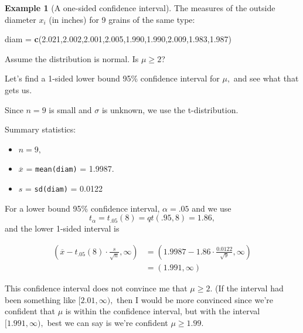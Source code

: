 \documentclass[
]{book}
\newenvironment{Shaded}{\begin{snugshade}}{\end{snugshade}}
\newcommand{\FloatTok}[1]{\textcolor[rgb]{0.00,0.00,0.81}{#1}}
\newcommand{\FunctionTok}[1]{\textcolor[rgb]{0.13,0.29,0.53}{\textbf{#1}}}
\newcommand{\NormalTok}[1]{#1}
\newcommand{\OtherTok}[1]{\textcolor[rgb]{0.56,0.35,0.01}{#1}}
\providecommand{\tightlist}{%
  \setlength{\itemsep}{0pt}\setlength{\parskip}{0pt}}
\theoremstyle{definition}
\theoremstyle{definition}
\newtheorem{example}{Example}[chapter]
\theoremstyle{definition}
\theoremstyle{definition}
\theoremstyle{remark}
\begin{document}
\begin{example}[A one-sided confidence interval]
The measures of the outside diameter \(x_i\) (in inches) for 9 grains of the same type:

\begin{Shaded}
\begin{Highlighting}[]
\NormalTok{diam }\OtherTok{=} \FunctionTok{c}\NormalTok{(}\FloatTok{2.021}\NormalTok{,}\FloatTok{2.002}\NormalTok{,}\FloatTok{2.001}\NormalTok{,}\FloatTok{2.005}\NormalTok{,}\FloatTok{1.990}\NormalTok{,}\FloatTok{1.990}\NormalTok{,}\FloatTok{2.009}\NormalTok{,}\FloatTok{1.983}\NormalTok{,}\FloatTok{1.987}\NormalTok{)}
\end{Highlighting}
\end{Shaded}

Assume the distribution is normal. Is \(\mu \geq 2\)?

Let's find a 1-sided lower bound 95\% confidence interval for \(\mu,\) and see what that gets us.

Since \(n = 9\) is small and \(\sigma\) is unknown, we use the t-distribution.

Summary statistics:

\begin{itemize}
\tightlist
\item
  \(n = 9,\)
\item
  \(\overline{x}\) = \texttt{mean(diam)} = 1.9987.
\item
  \(s\) = \texttt{sd(diam)} = 0.0122
\end{itemize}

For a lower bound 95\% confidence interval, \(\alpha=.05\) and we use \[t_{\alpha} = t_{.05}(8) = qt(.95,8) = 1.86,\]
and the lower 1-sided interval is

\begin{align*}
(\overline{x}-t_{.05}(8)\cdot \frac{s}{\sqrt{n}},\infty) &= (1.9987 - 1.86\cdot\frac{0.0122}{\sqrt{9}},\infty) \\
&= (1.991,\infty)
\end{align*}

This confidence interval does not convince me that \(\mu \geq 2\).
(If the interval had been something like \([2.01,\infty),\) then I would be more convinced since we're confident that \(\mu\) is within the confidence interval, but with the interval \([1.991,\infty),\) best we can say is we're confident \(\mu \geq 1.99\).
\end{example}

\appendix
\end{document}
